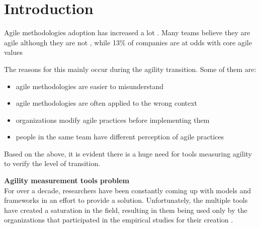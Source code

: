 \section{Introduction}
Agile methodologies adoption has increased a lot \cite{laurie_williams, Wang_Conboy, Salo_Abrahamsson}. Many teams believe they are agile although they are not \cite{ambysoft}, while 13\% of companies are at odds with core agile values \cite{versionOne}

The reasons for this mainly occur during the agility transition. Some of them are:

\begin{itemize}
	\item agile methodologies are easier to misunderstand \cite{6427226}
	\item agile methodologies are often applied to the wrong context \cite{cefam}
	\item organizations modify agile practices before implementing them \cite{1579312, 1629340}
	\item people in the same team have different perception of agile practices \cite{ambler}
\end{itemize}

Based on the above, it is evident there is a huge need for tools measuring agility to verify the level of transition.

\textbf{Agility measurement tools problem} \\
For over a decade, researchers have been constantly coming up with models and frameworks in an effort to provide a solution. Unfortunately, the multiple tools have created a saturation in the field, resulting in them being used only by the organizations that participated in the empirical studies for their creation \cite{samireh_jalali_dissertation, jalali_angelis}.


\clearpage